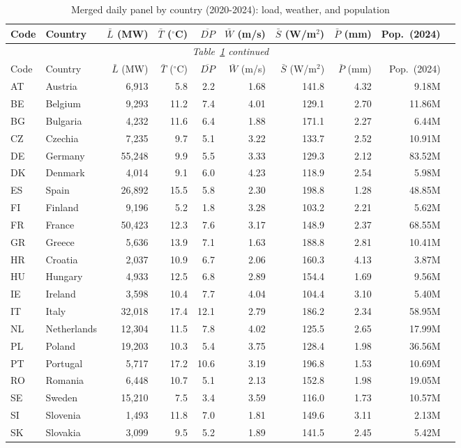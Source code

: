 \documentclass[12pt,a4paper]{article}
\begin{document}
\begin{longtable}{@{}llrrrrrrrr@{}}
  \caption{Merged daily panel by country (2020-2024): load, weather, and population} \label{tab:panel_variables} \\
  \toprule
  Code & Country& $\bar{L}$ (MW) & $\bar{T}$ ($^\circ$C) & $\overline{DP}$ & $\bar{W}$ (m/s) & $\bar{S}$ (W/m$^2$) & $\bar{P}$ (mm) & Pop.\ (2024) \\
  \midrule
  \endfirsthead
  \multicolumn{10}{c}{\textit{Table~\ref{tab:panel_variables} continued}} \\
  \toprule
  Code & Country& $\bar{L}$ (MW) & $\bar{T}$ ($^\circ$C) & $\overline{DP}$ & $\bar{W}$ (m/s) & $\bar{S}$ (W/m$^2$) & $\bar{P}$ (mm) & Pop.\ (2024) \\
  \midrule
  \endhead
  \bottomrule
  \endfoot
  AT & Austria & 6,913 & 5.8 & 2.2 & 1.68 & 141.8 & 4.32 & 9.18M \\
  BE & Belgium & 9,293 & 11.2 & 7.4 & 4.01 & 129.1 & 2.70 & 11.86M \\
  BG & Bulgaria & 4,232 & 11.6 & 6.4 & 1.88 & 171.1 & 2.27 & 6.44M \\
  CZ & Czechia & 7,235 & 9.7 & 5.1 & 3.22 & 133.7 & 2.52 & 10.91M \\
  DE & Germany & 55,248 & 9.9 & 5.5 & 3.33 & 129.3 & 2.12 & 83.52M \\
  DK & Denmark & 4,014 & 9.1 & 6.0 & 4.23 & 118.9 & 2.54 & 5.98M \\
  ES & Spain & 26,892 & 15.5 & 5.8 & 2.30 & 198.8 & 1.28 & 48.85M \\
  FI & Finland & 9,196 & 5.2 & 1.8 & 3.28 & 103.2 & 2.21 & 5.62M \\
  FR & France & 50,423 & 12.3 & 7.6 & 3.17 & 148.9 & 2.37 & 68.55M \\
  GR & Greece & 5,636 & 13.9 & 7.1 & 1.63 & 188.8 & 2.81 & 10.41M \\
  HR & Croatia & 2,037 & 10.9 & 6.7 & 2.06 & 160.3 & 4.13 & 3.87M \\
  HU & Hungary & 4,933 & 12.5 & 6.8 & 2.89 & 154.4 & 1.69 & 9.56M \\
  IE & Ireland & 3,598 & 10.4 & 7.7 & 4.04 & 104.4 & 3.10 & 5.40M \\
  IT & Italy & 32,018 & 17.4 & 12.1 & 2.79 & 186.2 & 2.34 & 58.95M \\
  NL & Netherlands & 12,304 & 11.5 & 7.8 & 4.02 & 125.5 & 2.65 & 17.99M \\
  PL & Poland & 19,203 & 10.3 & 5.4 & 3.75 & 128.4 & 1.98 & 36.56M \\
  PT & Portugal & 5,717 & 17.2 & 10.6 & 3.19 & 196.8 & 1.53 & 10.69M \\
  RO & Romania & 6,448 & 10.7 & 5.1 & 2.13 & 152.8 & 1.98 & 19.05M \\
  SE & Sweden & 15,210 & 7.5 & 3.4 & 3.59 & 116.0 & 1.73 & 10.57M \\
  SI & Slovenia & 1,493 & 11.8 & 7.0 & 1.81 & 149.6 & 3.11 & 2.13M \\
  SK & Slovakia & 3,099 & 9.5 & 5.2 & 1.89 & 141.5 & 2.45 & 5.42M \\
\end{longtable}
\end{document}
